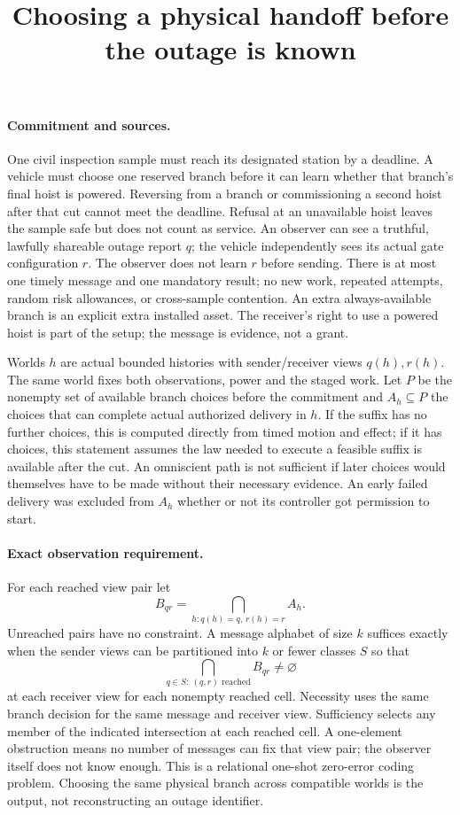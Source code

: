 \documentclass[11pt]{article}
\title{Choosing a physical handoff before the outage is known}
\date{}
\begin{document}
\maketitle

\paragraph{Commitment and sources.}
One civil inspection sample must reach its designated station by a deadline. A vehicle must choose one reserved branch before it can learn whether that branch's final hoist is powered. Reversing from a branch or commissioning a second hoist after that cut cannot meet the deadline. Refusal at an unavailable hoist leaves the sample safe but does not count as service. An observer can see a truthful, lawfully shareable outage report $q$; the vehicle independently sees its actual gate configuration $r$. The observer does not learn $r$ before sending. There is at most one timely message and one mandatory result; no new work, repeated attempts, random risk allowances, or cross-sample contention. An extra always-available branch is an explicit extra installed asset. The receiver's right to use a powered hoist is part of the setup; the message is evidence, not a grant.

Worlds $h$ are actual bounded histories with sender/receiver views $q(h),r(h)$. The same world fixes both observations, power and the staged work. Let $P$ be the nonempty set of available branch choices before the commitment and $A_h\subseteq P$ the choices that can complete actual authorized delivery in $h$. If the suffix has no further choices, this is computed directly from timed motion and effect; if it has choices, this statement assumes the law needed to execute a feasible suffix is available after the cut. An omniscient path is not sufficient if later choices would themselves have to be made without their necessary evidence. An early failed delivery was excluded from $A_h$ whether or not its controller got permission to start.

\paragraph{Exact observation requirement.}
For each reached view pair let
\[
 B_{qr}=\bigcap_{h:q(h)=q,\,r(h)=r} A_h.
\]
Unreached pairs have no constraint. A message alphabet of size $k$ suffices exactly when the sender views can be partitioned into $k$ or fewer classes $S$ so that
\[
 \bigcap_{q\in S:\ (q,r)\text{ reached}} B_{qr}\ne\varnothing
\]
at each receiver view for each nonempty reached cell. Necessity uses the same branch decision for the same message and receiver view. Sufficiency selects any member of the indicated intersection at each reached cell. A one-element obstruction means no number of messages can fix that view pair; the observer itself does not know enough. This is a relational one-shot zero-error coding problem. Choosing the same physical branch across compatible worlds is the output, not reconstructing an outage identifier.
\end{document}
